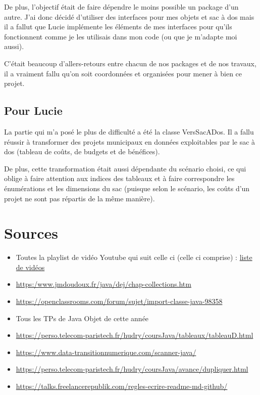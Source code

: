 \documentclass[11pt]{article}
\begin{document}
De plus, l'objectif était de faire dépendre le moins possible un package d'un autre. J'ai donc décidé d'utiliser des interfaces pour mes objets et sac à dos mais il a fallut que Lucie implémente les éléments de mes interfaces pour qu'ils fonctionnent comme je les utilisais dans mon code (ou que je m'adapte moi aussi). 

C'était beaucoup d'allers-retours entre chacun de nos packages et de nos travaux, il a vraiment fallu qu'on soit coordonnées et organisées pour mener à bien ce projet. 


\subsection{Pour Lucie}
La partie qui m’a posé le plus de difficulté a été la classe VersSacADos. Il a fallu réussir à transformer des projets municipaux en données exploitables par le sac à dos (tableau de coûts, de budgets et de bénéfices). 

De plus, cette transformation était aussi dépendante du scénario choisi, ce qui oblige à faire attention aux indices des tableaux et à faire correspondre les énumérations et les dimensions du sac (puisque selon le scénario, les coûts d’un projet ne sont pas répartis de la même manière). 





\section{Sources}

\begin{itemize}
	\item Toutes la playlist de vidéo Youtube qui suit celle ci (celle ci comprise) : \href{https://youtu.be/VqKZ0tRwUIc?si=KeZxsjvqFKFwB6U-}{liste de vidéos}
	\item \href{https://www.jmdoudoux.fr/java/dej/chap-collections.htm}{https:/www.jmdoudoux.fr/java/dej/chap-collections.htm}
	\item \href{https://openclassrooms.com/forum/sujet/import-classe-java-98358}{https://openclassrooms.com/forum/sujet/import-classe-java-98358}
	\item Tous les TPs de Java Objet de cette année
	\item \href{https://perso.telecom-paristech.fr/hudry/coursJava/tableaux/tableauD.html}{https://perso.telecom-paristech.fr/hudry/coursJava/tableaux/tableauD.html}
	\item \href{https://www.data-transitionnumerique.com/scanner-java/}{https://www.data-transitionnumerique.com/scanner-java/}
	\item \href{https://perso.telecom-paristech.fr/hudry/coursJava/avance/dupliquer.html}{https://perso.telecom-paristech.fr/hudry/coursJava/avance/dupliquer.html}
	\item \href{https://talks.freelancerepublik.com/regles-ecrire-readme-md-github/}{https://talks.freelancerepublik.com/regles-ecrire-readme-md-github/}
	\end{itemize} 
	
\end{document}
